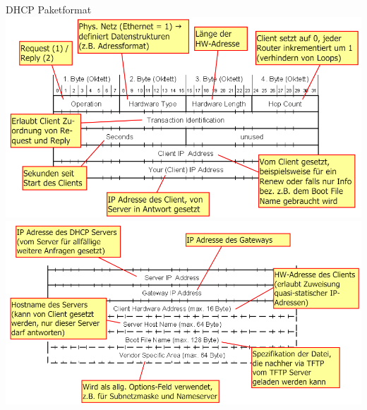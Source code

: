 \begin{definition}{DHCP Paketformat}\\
    \includegraphics[width=1\linewidth]{images/dhcp_format1.png}\\
    \includegraphics[width=1\linewidth]{images/dhcp_format2.png}
\end{definition}

